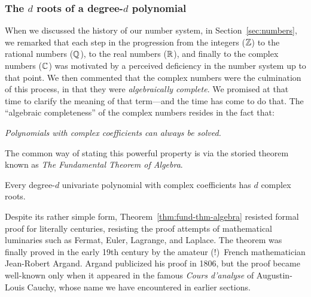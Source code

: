 \subsubsection{The $d$ roots of a degree-$d$ polynomial}
\label{sec:fund-thm-algebra}

When we discussed the history of our number system, in
Section~\ref{sec:numbers}, we remarked that each step in the
progression from the integers ($\mathbb{Z}$) to the rational numbers ($\mathbb{Q}$),
to the real numbers ($\mathbb{R}$), and finally to the complex numbers ($\mathbb{C}$)
was motivated by a perceived deficiency in the number system up to
that point.  We then commented that the complex numbers were the
culmination of this process, in that they were {\it algebraically
  complete}.   We promised at that time
to clarify the meaning of that term---and the time has come to do
that.  The ``algebraic completeness'' of the complex numbers resides
in the fact that:

{\em Polynomials with complex coefficients can always be solved.}

\noindent
The common way of stating this powerful property is via the storied
theorem known as {\it The Fundamental Theorem of Algebra}.

\begin{theorem}
\label{thm:fund-thm-algebra}
Every degree-$d$ univariate polynomial with complex coefficients has
$d$ complex roots.
\end{theorem}

Despite its rather simple form, Theorem~\ref{thm:fund-thm-algebra}
resisted formal proof for literally centuries, resisting the proof
attempts of mathematical luminaries such as Fermat, 
 Euler,  Lagrange,
 and Laplace.
The theorem was finally proved in the early 19th century by the
amateur (!)~French mathematician Jean-Robert Argand.
Argand publicized his proof in 1806, \cite{Argand} but the proof
became well-known only when it appeared in the famous {\it Cours
  d'analyse} \cite{Cauchy21} of Augustin-Louis Cauchy,
whose name we have encountered in earlier sections.

\medskip

